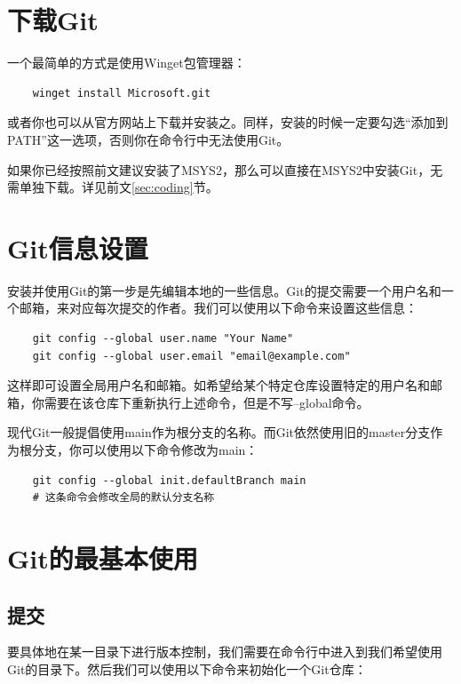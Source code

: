 \section{下载Git}

一个最简单的方式是使用Winget包管理器：

\begin{verbatim}
    winget install Microsoft.git
\end{verbatim}

或者你也可以从官方网站上下载并安装之。同样，安装的时候一定要勾选“添加到PATH”这一选项，否则你在命令行中无法使用Git。

如果你已经按照前文建议安装了MSYS2，那么可以直接在MSYS2中安装Git，无需单独下载。详见前文\ref{sec:coding}节。

\section{Git信息设置}

安装并使用Git的第一步是先编辑本地的一些信息。Git的提交需要一个用户名和一个邮箱，来对应每次提交的作者。我们可以使用以下命令来设置这些信息：

\begin{verbatim}
    git config --global user.name "Your Name"
    git config --global user.email "email@example.com"
\end{verbatim}

这样即可设置全局用户名和邮箱。如希望给某个特定仓库设置特定的用户名和邮箱，你需要在该仓库下重新执行上述命令，但是不写--global命令。

现代Git一般提倡使用main作为根分支的名称。而Git依然使用旧的master分支作为根分支，你可以使用以下命令修改为main：

\begin{verbatim}
    git config --global init.defaultBranch main
    # 这条命令会修改全局的默认分支名称
\end{verbatim}

\section{Git的最基本使用}

\subsection{提交}

要具体地在某一目录下进行版本控制，我们需要在命令行中进入到我们希望使用Git的目录下。然后我们可以使用以下命令来初始化一个Git仓库：

